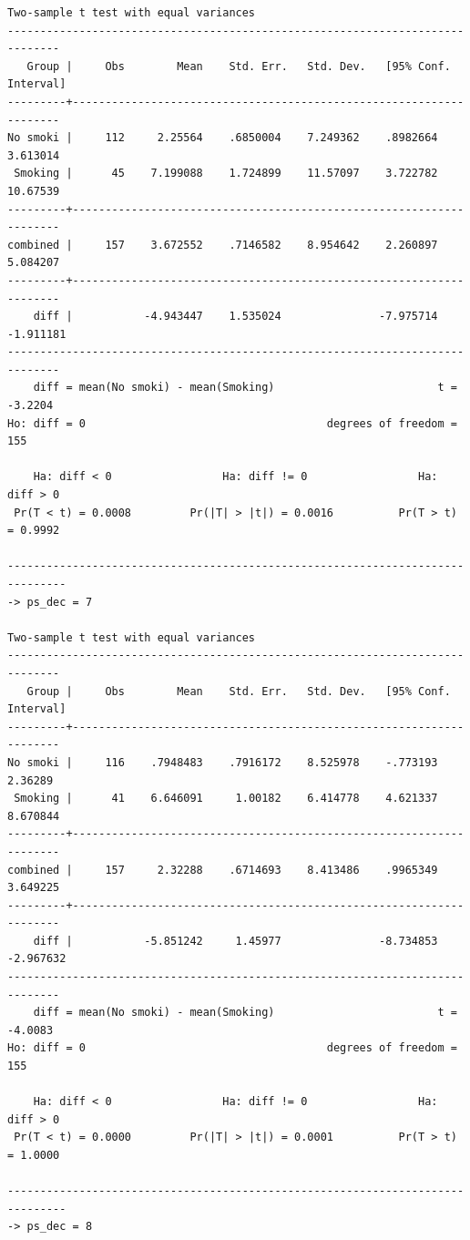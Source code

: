 \documentclass[
  10pt,
]{book}
\begin{document}
\begin{verbatim}
Two-sample t test with equal variances
------------------------------------------------------------------------------
   Group |     Obs        Mean    Std. Err.   Std. Dev.   [95% Conf. Interval]
---------+--------------------------------------------------------------------
No smoki |     112     2.25564    .6850004    7.249362    .8982664    3.613014
 Smoking |      45    7.199088    1.724899    11.57097    3.722782    10.67539
---------+--------------------------------------------------------------------
combined |     157    3.672552    .7146582    8.954642    2.260897    5.084207
---------+--------------------------------------------------------------------
    diff |           -4.943447    1.535024               -7.975714   -1.911181
------------------------------------------------------------------------------
    diff = mean(No smoki) - mean(Smoking)                         t =  -3.2204
Ho: diff = 0                                     degrees of freedom =      155

    Ha: diff < 0                 Ha: diff != 0                 Ha: diff > 0
 Pr(T < t) = 0.0008         Pr(|T| > |t|) = 0.0016          Pr(T > t) = 0.9992

-------------------------------------------------------------------------------
-> ps_dec = 7

Two-sample t test with equal variances
------------------------------------------------------------------------------
   Group |     Obs        Mean    Std. Err.   Std. Dev.   [95% Conf. Interval]
---------+--------------------------------------------------------------------
No smoki |     116    .7948483    .7916172    8.525978    -.773193     2.36289
 Smoking |      41    6.646091     1.00182    6.414778    4.621337    8.670844
---------+--------------------------------------------------------------------
combined |     157     2.32288    .6714693    8.413486    .9965349    3.649225
---------+--------------------------------------------------------------------
    diff |           -5.851242     1.45977               -8.734853   -2.967632
------------------------------------------------------------------------------
    diff = mean(No smoki) - mean(Smoking)                         t =  -4.0083
Ho: diff = 0                                     degrees of freedom =      155

    Ha: diff < 0                 Ha: diff != 0                 Ha: diff > 0
 Pr(T < t) = 0.0000         Pr(|T| > |t|) = 0.0001          Pr(T > t) = 1.0000

-------------------------------------------------------------------------------
-> ps_dec = 8


\end{verbatim}
\end{document}
